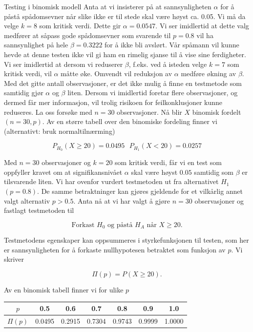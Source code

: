 \begin{eksempel}{Testing i binomisk modell}
\noindent Anta at vi insisterer på at sannsynligheten $\alpha$ for å
påstå spådomsevner når slike ikke er til stede skal være 
høyst ca. 0.05. Vi må da velge $k=8$ som kritisk verdi. Dette gir 
$\alpha =0.0547$. Vi ser imidlertid at dette valg medfører at såpass
gode spådomsevner som svarende til $p=0.8$ vil ha sannsynlighet på
hele $\beta = 0.3222$ for å ikke bli avslørt. Vår spåmann vil
kunne hevde at denne testen ikke vil gi ham en rimelig sjanse til
å vise sine ferdigheter. Vi ser imidlertid at dersom vi reduserer
$\beta$, f.eks. ved å isteden velge $k=7$ som kritisk verdi, vil
$\alpha$ måtte øke. Omvendt vil reduksjon av $\alpha$ medføre
økning av $\beta$. Med det gitte antall observasjoner, er det ikke
mulig å finne en testmetode som samtidig gjør $\alpha$ og $\beta$
liten. Dersom vi imidlertid foretar flere observasjoner, og
dermed får mer informasjon, vil trolig risikoen for
feilkonklusjoner kunne reduseres.
La oss forsøke med $n=30$ observasjoner. Nå blir $X$ binomisk
fordelt $(n=30, p)$. Av en større tabell over den binomiske
fordeling finner vi (alternativt: bruk normaltilnærming)

\[ P_{H_0}(X\geq 20)=0.0495 \mbox{\ \ \ \ \ } P_{H_1}(X < 20)=0.0257 \]

\noindent Med $n=30$ observasjoner og $k=20$ som kritisk verdi, får vi en
test som oppfyller kravet om at signifikansnivået $\alpha$
skal være høyst $0.05$ samtidig som $\beta$ er tilsvarende liten.
Vi har ovenfor vurdert testmetoden ut fra alternativet
$H_1$ $(p=0.8)$. De samme betraktninger kan gjøres gjeldende for et
vilkårlig annet valgt alternativ $p>0.5$.
Anta nå at vi har valgt å gjøre $n=30$ observasjoner og fastlagt
testmetoden til

\[   \mbox{Forkast $H_0$ og påstå $H_A$ når $X\geq 20$.} \]

\noindent Testmetodens egenskaper kan oppsummeres i styrkefunksjonen til
testen, som her er sannsynligheten
for å forkaste nullhypotesen betraktet som funksjon av $p$. Vi skriver

\[ \Pi (p)=P(X\geq 20). \]

\noindent Av en binomisk tabell finner vi for ulike $p$

\begin{center}
\begin{tabular}{c|cccccc}
 $p$& 0.5 & 0.6 & 0.7 & 0.8 & 0.9 & 1.0 \\ \hline
 $\Pi (p)$& 0.0495&0.2915&0.7304&0.9743&0.9999&1.0000 
\end{tabular}
\end{center}


\end{eksempel}
